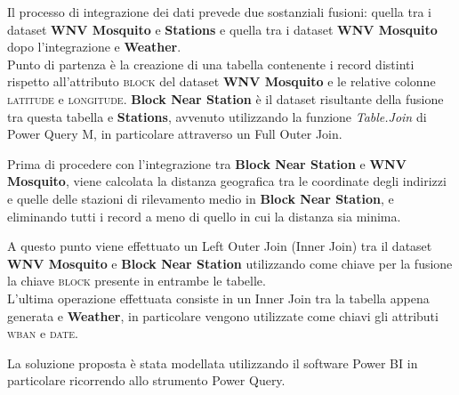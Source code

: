 Il processo di integrazione dei dati prevede due sostanziali fusioni: quella tra i dataset \textbf{WNV Mosquito} e \textbf{Stations} e quella tra i dataset \textbf{WNV Mosquito} dopo l'integrazione e \textbf{Weather}.\\ 

Punto di partenza è la creazione di una tabella contenente i record distinti rispetto all'attributo \textsc{block} del dataset \textbf{WNV Mosquito} e le relative colonne \textsc{latitude} e \textsc{longitude}. 
\textbf{Block Near Station} è il dataset risultante della fusione tra questa tabella e \textbf{Stations}, avvenuto utilizzando la funzione \textit{Table.Join} di Power Query M, in particolare attraverso un Full Outer Join. 

Prima di procedere con l'integrazione tra \textbf{Block Near Station} e \textbf{WNV Mosquito}, viene calcolata la distanza geografica tra le coordinate degli indirizzi e quelle delle stazioni di rilevamento medio in \textbf{Block Near Station}, e eliminando tutti i record a meno di quello in cui la distanza sia minima.

A questo punto viene effettuato un Left Outer Join (Inner Join) tra il dataset \textbf{WNV Mosquito} e \textbf{Block Near Station} utilizzando come chiave per la fusione la chiave \textsc{block} presente in entrambe le tabelle.\\


L'ultima operazione effettuata consiste in un Inner Join tra la tabella appena generata e \textbf{Weather}, in particolare vengono utilizzate come chiavi gli attributi \textsc{wban} e \textsc{date}.

La soluzione proposta è stata modellata utilizzando il software Power BI in particolare ricorrendo allo strumento Power Query.

